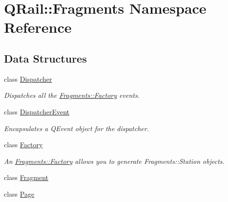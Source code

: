 \hypertarget{namespaceQRail_1_1Fragments}{}\section{Q\+Rail\+::Fragments Namespace Reference}
\label{namespaceQRail_1_1Fragments}
\subsection*{Data Structures}
\begin{DoxyCompactItemize}
\item 
class \mbox{\hyperlink{classQRail_1_1Fragments_1_1Dispatcher}{Dispatcher}}
\begin{DoxyCompactList}\small\item\em Dispatches all the \mbox{\hyperlink{classQRail_1_1Fragments_1_1Factory}{Fragments\+::\+Factory}} events. \end{DoxyCompactList}\item 
class \mbox{\hyperlink{classQRail_1_1Fragments_1_1DispatcherEvent}{Dispatcher\+Event}}
\begin{DoxyCompactList}\small\item\em Encapsulates a Q\+Event object for the dispatcher. \end{DoxyCompactList}\item 
class \mbox{\hyperlink{classQRail_1_1Fragments_1_1Factory}{Factory}}
\begin{DoxyCompactList}\small\item\em An \mbox{\hyperlink{classQRail_1_1Fragments_1_1Factory}{Fragments\+::\+Factory}} allows you to generate Fragments\+::\+Station objects. \end{DoxyCompactList}\item 
class \mbox{\hyperlink{classQRail_1_1Fragments_1_1Fragment}{Fragment}}
\item 
class \mbox{\hyperlink{classQRail_1_1Fragments_1_1Page}{Page}}
\end{DoxyCompactItemize}
